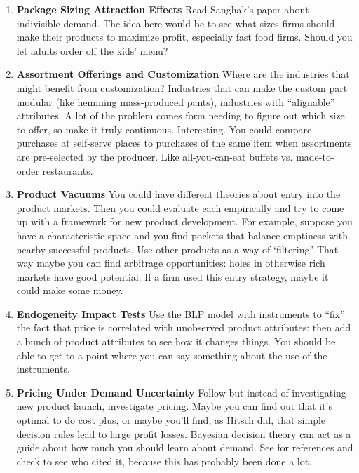 \documentclass[paper=a4, fontsize=11pt]{scrartcl} %
\numberwithin{equation}{section} %
\numberwithin{figure}{section} %
\numberwithin{table}{section} %
\begin{document}
\begin{enumerate}
\item \textbf{Package Sizing Attraction Effects} Read Sanghak's paper about indivisible demand.  The idea here would be to see what sizes firms should make their products to maximize profit, especially fast food firms.  Should you let adults order off the kids' menu?

\item \textbf{Assortment Offerings and Customization}  Where are the industries that might benefit from customization?  Industries that can make the custom part modular (like hemming mass-produced pants), industries with ``alignable'' attributes.  A lot of the problem comes form needing to figure out which size to offer, so make it truly continuous.  Interesting.  You could compare purchases at self-serve places to purchases of the same item when assortments are pre-selected by the producer.  Like all-you-can-eat buffets vs. made-to-order restaurants.  

\item \textbf{Product Vacuums}  You could have different theories about entry into the product markets.  Then you could evaluate each empirically and try to come up with a framework for new product development.  For example, suppose you have a characteristic space and you find pockets that balance emptiness with nearby successful products.  Use other products as a way of `filtering.'  That way maybe you can find arbitrage opportunities: holes in otherwise rich markets have good potential.  If a firm used this entry strategy, maybe it could make some money.

\item \textbf{Endogeneity Impact Tests} Use the BLP model with instruments to ``fix'' the fact that price is correlated with unobserved product attributes: then add a bunch of product attributes to see how it changes things.  You should be able to get to a point where you can say something about the use of the instruments.  

\item \textbf{Pricing Under Demand Uncertainty} Follow \cite{hitsch2006empirical} but instead of investigating new product launch, investigate pricing.  Maybe you can find out that it's optimal to do cost plus, or maybe you'll find, as Hitsch did, that simple decision rules lead to large profit losses.  Bayesian decision theory can act as a guide about how much you should learn about demand.  See \cite{hitsch2006empirical} for references and check to see who cited it, because this has probably been done a lot.


\end{enumerate}
\end{document}
